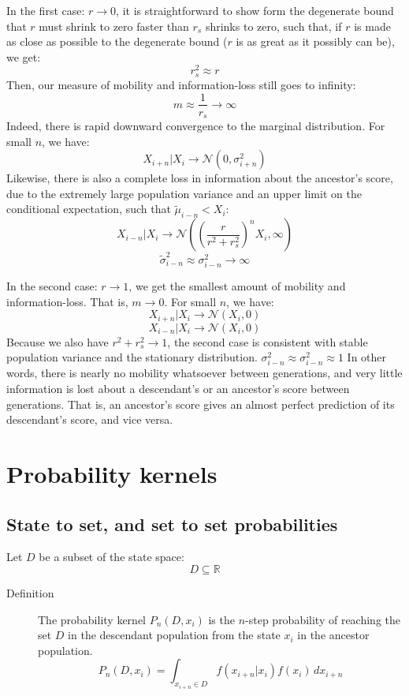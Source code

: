 \documentclass[a4paper,11pt]{article} %
\begin{document}
In the first case: $r \rightarrow 0$, it is straightforward to show form the degenerate bound that $r$ must shrink to zero faster than $r_s$ shrinks to zero, such that, if $r$ is made as close as possible to the degenerate bound ($r$ is as great as it possibly can be), we get:
$$r_s^2 \approx r$$
Then, our measure of mobility and information-loss still goes to infinity:
$$m \approx \frac{1}{r_s} \rightarrow \infty$$
Indeed, there is rapid downward convergence to the marginal distribution. For small $n$, we have:
$$X_{i+n}|X_i \rightarrow \mathcal{N}(0, \sigma_{i+n}^2)$$
Likewise, there is also a complete loss in information about the ancestor's score, due to the extremely large population variance and an upper limit on the conditional expectation, such that $\tilde{\mu}_{i-n} < X_i$:
$$X_{i-n}|X_i \rightarrow \mathcal{N}((\frac{r}{r^2+r_s^2})^n X_i, \infty)$$
$$\tilde{\sigma}_{i-n}^2 \approx \sigma_{i-n}^2 \rightarrow \infty$$


In the second case: $r \rightarrow 1$, we get the smallest amount of mobility and information-loss. That is, $m \rightarrow 0$. For small $n$, we have:
$$X_{i+n}|X_i \rightarrow \mathcal{N}(X_i, 0)$$
$$X_{i-n}|X_i \rightarrow \mathcal{N}(X_i, 0)$$
Because we also have $r^2 + r_s^2 \rightarrow 1$, the second case is consistent with stable population variance and the stationary distribution.
$\sigma_{i-n}^2 \approx \sigma_{i-n}^2 \approx 1$
In other words, there is nearly no mobility whatsoever between generations, and very little information is lost about a descendant's or an ancestor's score between generations. That is, an ancestor's score gives an almost perfect prediction of its descendant's score, and vice versa.




\section{Probability kernels}

\subsection{State to set, and set to set probabilities}
Let $D$ be a subset of the state space: 
%
$$D \subseteq \mathbb{R}$$

\begin{description}
\item [Definition] The probability kernel $P_n(D, x_i)$ is the $n$-step probability of reaching the set $D$ in the descendant population from the state $x_i$ in the ancestor population.
$$P_n(D, x_i) = \int_{x_{i+n}\in D}^{} f(x_{i+n}|x_i)f(x_i) \, dx_{i+n}$$
\end{description}
\end{document}

